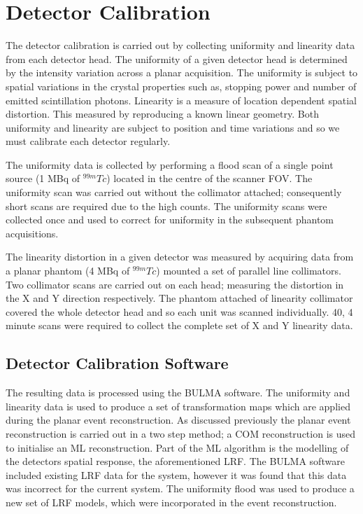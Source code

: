 \section{Detector Calibration}
The detector calibration is carried out by collecting uniformity and linearity data from each detector head. The uniformity of a given detector head is determined by the intensity variation across a planar acquisition. The uniformity is subject to spatial variations in the crystal properties such as, stopping power and number of emitted scintillation photons. Linearity is a measure of location dependent spatial distortion. This measured by reproducing a known linear geometry. Both uniformity and linearity are subject to position and time variations and so we must calibrate each detector regularly.

The uniformity data is collected by performing a flood scan of a single point source (1 MBq of $^{99m}Tc$) located in the centre of the scanner \acrshort{FOV}. The uniformity scan was carried out without the collimator attached; consequently short scans are required due to the high counts. The uniformity scans were collected once and used to correct for uniformity in the subsequent phantom acquisitions. 

The linearity distortion in a given detector was measured by acquiring data from a planar phantom (4 MBq of $^{99m}Tc$) mounted a set of parallel line collimators. Two collimator scans are carried out on each head; measuring the distortion in the X and Y direction respectively. The phantom attached of linearity collimator covered the whole detector head and so each unit was scanned individually. 40, 4 minute scans were required to collect the complete set of X and Y linearity data. 

\subsection{Detector Calibration Software}
The resulting data is processed using the BULMA software. The uniformity and linearity data is used to produce a set of transformation maps which are applied during the planar event reconstruction. As discussed previously the planar event reconstruction is carried out in a two step method; a \acrshort{COM} reconstruction is used to initialise an \acrshort{ML} reconstruction. Part of the \acrshort{ML} algorithm is the modelling of the detectors spatial response, the aforementioned \acrshort{LRF}. The BULMA software included existing \acrshort{LRF} data for the system, however it was found that this data was incorrect for the current system. The uniformity flood was used to produce a new set of \acrshort{LRF} models, which were incorporated in the event reconstruction.

